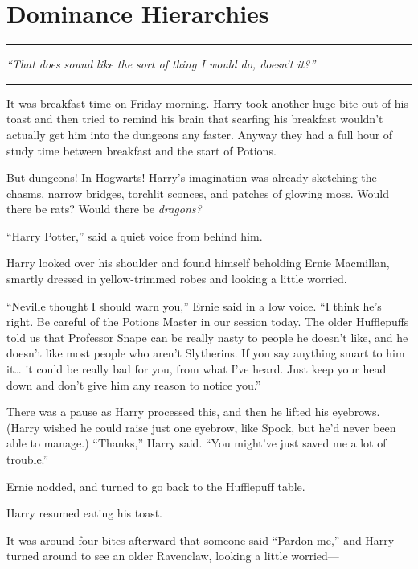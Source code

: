 \chapter{Dominance Hierarchies}\label{dominance-hierarchies}

\begin{center}\rule{3in}{0.4pt}\end{center}

\emph{``That does sound like the sort of thing I would do, doesn't
it?''}

\begin{center}\rule{3in}{0.4pt}\end{center}

It was breakfast time on Friday morning. Harry took another huge bite
out of his toast and then tried to remind his brain that scarfing his
breakfast wouldn't actually get him into the dungeons any faster. Anyway
they had a full hour of study time between breakfast and the start of
Potions.

But dungeons! In Hogwarts! Harry's imagination was already sketching the
chasms, narrow bridges, torchlit sconces, and patches of glowing moss.
Would there be rats? Would there be \emph{dragons?}

``Harry Potter,'' said a quiet voice from behind him.

Harry looked over his shoulder and found himself beholding Ernie
Macmillan, smartly dressed in yellow-trimmed robes and looking a little
worried.

``Neville thought I should warn you,'' Ernie said in a low voice. ``I
think he's right. Be careful of the Potions Master in our session today.
The older Hufflepuffs told us that Professor Snape can be really nasty
to people he doesn't like, and he doesn't like most people who aren't
Slytherins. If you say anything smart to him it\ldots{} it could be
really bad for you, from what I've heard. Just keep your head down and
don't give him any reason to notice you.''

There was a pause as Harry processed this, and then he lifted his
eyebrows. (Harry wished he could raise just one eyebrow, like Spock, but
he'd never been able to manage.) ``Thanks,'' Harry said. ``You might've
just saved me a lot of trouble.''

Ernie nodded, and turned to go back to the Hufflepuff table.

Harry resumed eating his toast.

It was around four bites afterward that someone said ``Pardon me,'' and
Harry turned around to see an older Ravenclaw, looking a little
worried---

